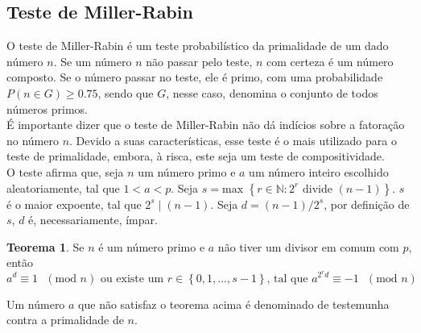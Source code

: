 \documentclass[14pt, oneside]{book}
\newcommand{\N}{\mathbb{N}}
\newcommand\tab[1][1cm]{\hspace*{#1}}
\theoremstyle{definition}
\newtheorem{teorema}{Teorema}
\begin{document}
                \subsection{Teste de Miller-Rabin}
                    \tab  O teste de Miller-Rabin é um teste probabilístico da primalidade de um dado número $n$. Se um número $n$ não passar pelo teste, $n$ com certeza é um número composto. Se o número passar no teste, ele é primo, com uma probabilidade $P(n\in G) \geq 0.75$, sendo que $G$, nesse caso, denomina o conjunto de todos números primos. \\
                    \tab É importante dizer que o teste de Miller-Rabin não dá indícios sobre a fatoração no número $n$. Devido a suas características, esse teste é o mais utilizado para o teste de primalidade, embora, à risca, este seja um teste de compositividade. \\
                    \tab O teste afirma que, seja $n$ um número primo e $a$ um número inteiro escolhido aleatoriamente, tal que $1 < a < p$. Seja $s = \textrm{max } \left\{r\in \N : 2^r \textrm{ divide } (n-1)\right\}$. $s$ é o maior expoente, tal que $2^s\mid (n-1)$. Seja $d = (n-1) / 2^s$, por definição de $s$, $d$ é, necessariamente, ímpar.
                    \begin{teorema} Se $n$ é um número primo e $a$ não tiver um divisor em comum com $p$, então $$a^d\equiv 1\textrm{ }(\textrm{mod } n) \textrm{ ou existe um }r\in \left\{0,1,...,s-1\right\}\textrm{, tal que } a^{2^rd}\equiv -1 \textrm{ }(\text{mod } n)$$
                    \end{teorema}
                    Um número $a$ que não satisfaz o teorema acima é denominado de testemunha contra a primalidade de $n$.
            
\end{document}
